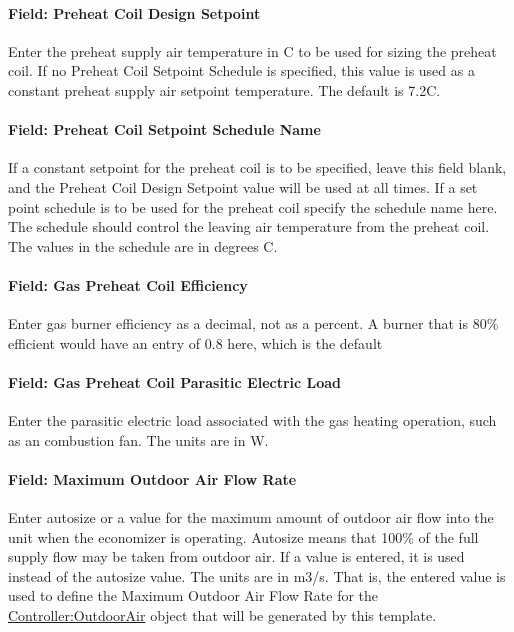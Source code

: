 \paragraph{Field: Preheat Coil Design Setpoint}\label{field-preheat-coil-design-setpoint-1}

Enter the preheat supply air temperature in C to be used for sizing the preheat coil. If no Preheat Coil Setpoint Schedule is specified, this value is used as a constant preheat supply air setpoint temperature. The default is 7.2C.

\paragraph{Field: Preheat Coil Setpoint Schedule Name}\label{field-preheat-coil-setpoint-schedule-name-1}

If a constant setpoint for the preheat coil is to be specified, leave this field blank, and the Preheat Coil Design Setpoint value will be used at all times. If a set point schedule is to be used for the preheat coil specify the schedule name here. The schedule should control the leaving air temperature from the preheat coil. The values in the schedule are in degrees C.

\paragraph{Field: Gas Preheat Coil Efficiency}\label{field-gas-preheat-coil-efficiency-1}

Enter gas burner efficiency as a decimal, not as a percent. A burner that is 80\% efficient would have an entry of 0.8 here, which is the default

\paragraph{Field: Gas Preheat Coil Parasitic Electric Load}\label{field-gas-preheat-coil-parasitic-electric-load-1}

Enter the parasitic electric load associated with the gas heating operation, such as an combustion fan. The units are in W.

\paragraph{Field: Maximum Outdoor Air Flow Rate}\label{field-maximum-outdoor-air-flow-rate-5}

Enter autosize or a value for the maximum amount of outdoor air flow into the unit when the economizer is operating. Autosize means that 100\% of the full supply flow may be taken from outdoor air. If a value is entered, it is used instead of the autosize value. The units are in m3/s. That is, the entered value is used to define the Maximum Outdoor Air Flow Rate for the \hyperref[controlleroutdoorair]{Controller:OutdoorAir} object that will be generated by this template.

